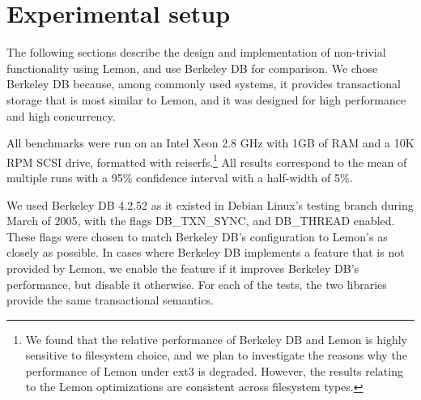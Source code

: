 \documentclass[10pt,letterpaper,twocolumn,english]{article}
\newcommand{\yad}{Lemon\xspace}
\begin{document}
%



\section{Experimental setup}
\label{sec:experimental_setup}

The following sections describe the design and implementation of
non-trivial functionality using \yad, and use Berkeley DB for
comparison.  We chose Berkeley DB because, among
commonly used systems, it provides transactional storage that is most
similar to \yad, and it was
designed for high performance and high concurrency.

All benchmarks were run on an Intel Xeon 2.8 GHz with 1GB of RAM and a
10K RPM SCSI drive, formatted with reiserfs.\footnote{We found that the
relative performance of Berkeley DB and \yad is highly sensitive to
filesystem choice, and we plan to investigate the reasons why the
performance of \yad under ext3 is degraded. However, the results
relating to the \yad optimizations are consistent across filesystem
types.}  All results correspond to the mean of multiple runs
with a 95\% confidence interval with a half-width of 5\%.

We used Berkeley DB 4.2.52 as it existed in Debian Linux's testing
branch during March of 2005, with the flags DB\_TXN\_SYNC, and DB\_THREAD
enabled. These flags were chosen to match 
Berkeley DB's configuration to \yad's as closely as possible.  In cases where
Berkeley DB implements a feature that is not provided by \yad, we
enable the feature if it improves Berkeley DB's performance, but
disable it otherwise.
For each of the tests, the two libraries provide the same transactional semantics.
\end{document}
